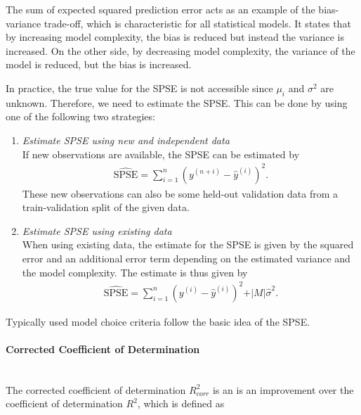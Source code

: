 \documentclass[10pt,a4paper]{report}
\newcommand{\subsubsubsection}[1]{\paragraph{#1}\mbox{}\\}
\begin{document}
The sum of expected squared prediction error acts as an example of the bias-variance trade-off, which is characteristic for all statistical models. It states that by increasing model complexity, the bias is reduced but instead the variance is increased. On the other side, by decreasing model complexity, the variance of the model is reduced, but the bias is increased. \cite{bishop2006patternRecognition}


In practice, the true value for the SPSE is not accessible since $\mu_i$ and $\sigma^2$ are unknown. Therefore, we need to estimate the SPSE. This can be done by using one of the following two strategies:

\begin{enumerate}

	\item \emph{Estimate SPSE using new and independent data} \\	
	If new observations are available, the SPSE can be estimated by
	\begin{align}
		\widehat{\text{SPSE}} = \sum_{i=1}^n (y^{(n+i)} - \hat y^{(i)})^2.
	\end{align}
	These new observations can also be some held-out validation data from a train-validation split of the given data. 
	
	\item \emph{Estimate SPSE using existing data} \\
	When using existing data, the estimate for the SPSE is given by the squared error and an additional error term depending on the estimated variance and the model complexity. The estimate is thus given by
	\begin{align}
		\widehat{\text{SPSE}} = \sum_{i=1}^n(y^{(i)} - \hat y^{(i)})^2 + \vert M \vert \hat \sigma^2.
	\end{align}

\end{enumerate}


Typically used model choice criteria follow the basic idea of the SPSE. \cite{fahrmeir2013regression}

\subsubsubsection{Corrected Coefficient of Determination}

The corrected coefficient of determination $R^2_{corr}$ is an is an improvement over the coefficient of determination $R^2$, which is defined as 
\end{document}
